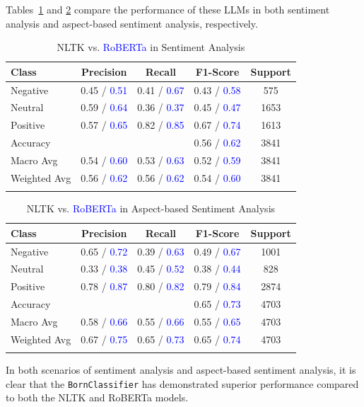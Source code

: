 Tables~\ref{tab:llm_sentiment} and \ref{tab:llm_absa} compare the performance of these LLMs in both sentiment analysis and aspect-based sentiment analysis, respectively.

\begin{table}[h]
    \caption{NLTK vs. \textcolor{blue}{RoBERTa} in Sentiment Analysis}\label{tab:llm_sentiment}
    \begin{tabular*}{\textwidth}{@{\extracolsep{\fill}}lcccc}
    \toprule
    Class & Precision & Recall & F1-Score & Support \\
    \midrule
    Negative & 0.45 / \textcolor{blue}{0.51} & 0.41 / \textcolor{blue}{0.67} & 0.43 / \textcolor{blue}{0.58} & 575 \\
    Neutral & 0.59 / \textcolor{blue}{0.64} & 0.36 / \textcolor{blue}{0.37} & 0.45 / \textcolor{blue}{0.47} & 1653 \\
    Positive & 0.57 / \textcolor{blue}{0.65} & 0.82 / \textcolor{blue}{0.85} & 0.67 / \textcolor{blue}{0.74} & 1613 \\
    \midrule
    Accuracy & & & 0.56 / \textcolor{blue}{0.62} & 3841 \\
    Macro Avg & 0.54 / \textcolor{blue}{0.60} & 0.53 / \textcolor{blue}{0.63} & 0.52 / \textcolor{blue}{0.59} & 3841 \\
    Weighted Avg & 0.56 / \textcolor{blue}{0.62} & 0.56 / \textcolor{blue}{0.62} & 0.54 / \textcolor{blue}{0.60} & 3841 \\
    \botrule
    \end{tabular*}
\end{table}

\begin{table}[h]
    \caption{NLTK vs. \textcolor{blue}{RoBERTa} in Aspect-based Sentiment Analysis}\label{tab:llm_absa}
    \begin{tabular*}{\textwidth}{@{\extracolsep{\fill}}lcccc}
    \toprule
    Class & Precision & Recall & F1-Score & Support \\
    \midrule
    Negative & 0.65 / \textcolor{blue}{0.72} & 0.39 / \textcolor{blue}{0.63} & 0.49 / \textcolor{blue}{0.67} & 1001 \\
    Neutral & 0.33 / \textcolor{blue}{0.38} & 0.45 / \textcolor{blue}{0.52} & 0.38 / \textcolor{blue}{0.44} & 828 \\
    Positive & 0.78 / \textcolor{blue}{0.87} & 0.80 / \textcolor{blue}{0.82} & 0.79 / \textcolor{blue}{0.84} & 2874 \\
    \midrule
    Accuracy & & & 0.65 / \textcolor{blue}{0.73} & 4703 \\
    Macro Avg & 0.58 / \textcolor{blue}{0.66} & 0.55 / \textcolor{blue}{0.66} & 0.55 / \textcolor{blue}{0.65} & 4703 \\
    Weighted Avg & 0.67 / \textcolor{blue}{0.75} & 0.65 / \textcolor{blue}{0.73} & 0.65 / \textcolor{blue}{0.74} & 4703 \\
    \botrule
    \end{tabular*}
\end{table}

In both scenarios of sentiment analysis and aspect-based sentiment analysis, it is clear that the \texttt{BornClassifier} has demonstrated superior performance compared to both the NLTK and RoBERTa models.
